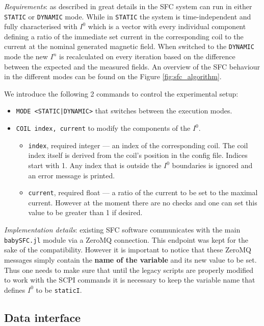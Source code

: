 \textit{Requirements}: as described in great details in \cite{Franke2013} the SFC system can run in either \texttt{STATIC} or \texttt{DYNAMIC} mode. While in \texttt{STATIC} the system is time-independent and fully characterised with $I^0$ which is a vector with every individual component defining a ratio of the immediate set current in the corresponding coil to the current at the nominal generated magnetic field. When switched to the \texttt{DYNAMIC} mode the new $I^n$ is recalculated on every iteration based on the difference between the expected and the measured fields. An overview of the SFC behaviour in the different modes can be found on the Figure \ref{fig:sfc_algorithm}.

We introduce the following 2 commands to control the experimental setup:
\begin{itemize}
	\item \texttt{MODE <STATIC|DYNAMIC>} that switches between the execution modes.
	\item{
		\texttt{COIL index, current} to modify the components of the $I^0$.
		\begin{itemize}
			\item \texttt{index}, required integer --- an index of the corresponding coil. The coil index itself is derived from the coil's position in the config file. Indices start with 1. Any index that is outside the $I^0$ boundaries is ignored and an error message is printed.
			\item \texttt{current}, required float --- a ratio of the current to be set to the maximal current. However at the moment there are no checks and one can set this value to be greater than 1 if desired.
		\end{itemize}
	}
\end{itemize}

\textit{Implementation details}: existing SFC software communicates with the main \texttt{babySFC.jl} module via a ZeroMQ connection. This endpoint was kept for the sake of the compatibility. However it is important to notice that these ZeroMQ messages simply contain the \textbf{name of the variable} and its new value to be set. Thus one needs to make sure that until the legacy scripts are properly modified to work with the SCPI commands it is necessary to keep the variable name that defines $I^0$ to be \texttt{staticI}.

\subsection{Data interface}
\label{subsec:sfc_data}

